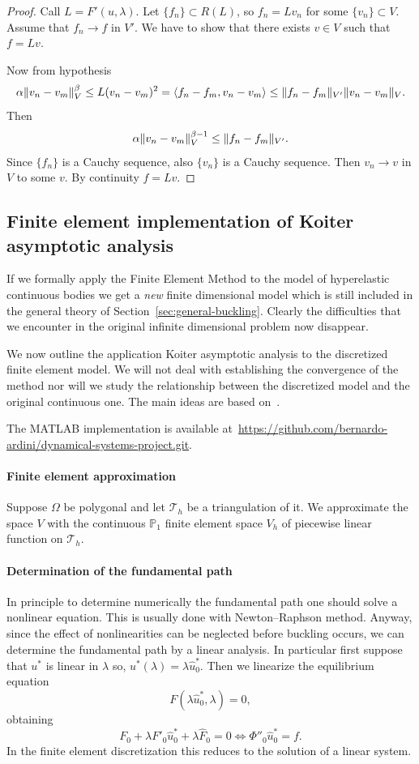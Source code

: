 \documentclass[a4paper,11pt]{article}
\theoremstyle{definition}
\DeclarePairedDelimiter{\norm}{\lVert}{\rVert}
\DeclarePairedDelimiter{\dual}{\langle}{\rangle}
\begin{document}
\begin{proof}
Call $L=F'(u,\lambda)$. Let $\{f_n\}\subset R(L)$, so $f_n=Lv_n$ for some $\{v_n\}\subset V$. Assume that $f_n\to f$ in $V'$. We have to show that there exists $v\in V$ such that $f=Lv$.

Now from hypothesis
\[
\alpha\norm{v_n-v_m}_V^\beta\le L(v_n-v_m)^2=\dual{f_n-f_m,v_n-v_m}\le\norm{f_n-f_m}_{V'}\norm{v_n-v_m}_V. 
\]
Then
\[
\alpha\norm{v_n-v_m}_V^{\beta-1}\le\norm{f_n-f_m}_{V'}.
\]
Since $\{f_n\}$ is a Cauchy sequence, also $\{v_n\}$ is a Cauchy sequence. Then $v_n\to v$ in $V$ to some $v$. By continuity $f=Lv$.
\end{proof}

\subsection{Finite element implementation of Koiter asymptotic analysis}

If we formally apply the Finite Element Method to the model of hyperelastic continuous bodies we get a \emph{new} finite dimensional model which is still included in the general theory of Section~\ref{sec:general-buckling}. Clearly the difficulties that we encounter in the original infinite dimensional problem now disappear.

We now outline the application Koiter asymptotic analysis to the discretized finite element model. We will not deal with establishing the convergence of the method nor will we study the relationship between the discretized model and the original continuous one. The main ideas are based on~\cite{casciaro}.

The MATLAB implementation is available at~\url{https://github.com/bernardo-ardini/dynamical-systems-project.git}.

\paragraph{Finite element approximation} Suppose $\Omega$ be polygonal and let $\mathscr{T}_h$ be a triangulation of it. We approximate the space $V$ with the continuous $\mathbb{P}_1$ finite element space $V_h$ of piecewise linear function on $\mathscr{T}_h$.

\paragraph{Determination of the fundamental path} In principle to determine numerically the fundamental path one should solve a nonlinear equation. This is usually done with Newton--Raphson method. Anyway, since the effect of nonlinearities can be neglected before buckling occurs, we can determine the fundamental path by a linear analysis. In particular first suppose that $u^*$ is linear in $\lambda$ so, $u^*(\lambda)=\lambda\hat u^*_0$. Then we linearize the equilibrium equation
\[
F(\lambda\hat u^*_0,\lambda)=0,
\]
obtaining
\[
F_0+\lambda F'_0\hat u^*_0+\lambda\hat F_0=0\iff \Phi''_0\hat u^*_0=f.
\]
In the finite element discretization this reduces to the solution of a linear system.
\end{document}
